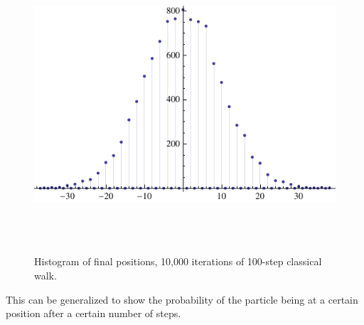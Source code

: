 \documentclass[a0,portrait]{a0poster}
\begin{document}
\begin{center}
{\begin{figure}
\includegraphics[height=110mm]{classic-10k-of-100-itterations.pdf}
\caption{Histogram of final positions, 10,000 iterations of 100-step classical walk.}
\label{clas_10k}
\end{figure}    

This can be generalized to show the probability of the particle being at a certain position after a certain number of steps\cite{kempe}.

}
\end{center}
\end{document}

